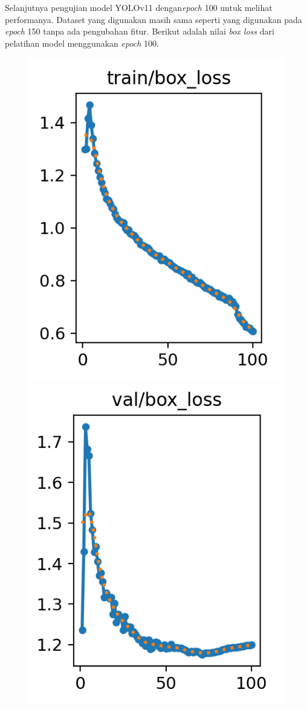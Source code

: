 Selanjutnya pengujian model YOLOv11 dengan\emph{epoch} 100 untuk melihat performanya. Dataset yang digunakan masih sama seperti yang digunakan pada \emph{epoch} 150 tanpa ada pengubahan fitur.
Berikut adalah nilai \emph{box loss} dari pelatihan model menggunakan \emph{epoch} 100.
\begin{figure} [H] \centering
  \includegraphics[scale=0.55]{gambar/box loss epoch 100.png}
  \includegraphics[scale=0.55]{gambar/val loss epoch 100.png}

\end{figure}
